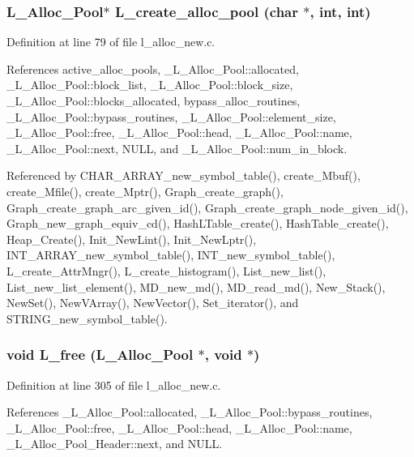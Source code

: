 \subsubsection{\setlength{\rightskip}{0pt plus 5cm}\bf{L\_\-Alloc\_\-Pool}$\ast$ L\_\-create\_\-alloc\_\-pool (char $\ast$, int, int)}\label{l__alloc__new_8h_50486297fa3e0e5231a908843297c86f}




Definition at line 79 of file l\_\-alloc\_\-new.c.

References active\_\-alloc\_\-pools, \_\-L\_\-Alloc\_\-Pool::allocated, \_\-L\_\-Alloc\_\-Pool::block\_\-list, \_\-L\_\-Alloc\_\-Pool::block\_\-size, \_\-L\_\-Alloc\_\-Pool::blocks\_\-allocated, bypass\_\-alloc\_\-routines, \_\-L\_\-Alloc\_\-Pool::bypass\_\-routines, \_\-L\_\-Alloc\_\-Pool::element\_\-size, \_\-L\_\-Alloc\_\-Pool::free, \_\-L\_\-Alloc\_\-Pool::head, \_\-L\_\-Alloc\_\-Pool::name, \_\-L\_\-Alloc\_\-Pool::next, NULL, and \_\-L\_\-Alloc\_\-Pool::num\_\-in\_\-block.

Referenced by CHAR\_\-ARRAY\_\-new\_\-symbol\_\-table(), create\_\-Mbuf(), create\_\-Mfile(), create\_\-Mptr(), Graph\_\-create\_\-graph(), Graph\_\-create\_\-graph\_\-arc\_\-given\_\-id(), Graph\_\-create\_\-graph\_\-node\_\-given\_\-id(), Graph\_\-new\_\-graph\_\-equiv\_\-cd(), Hash\-LTable\_\-create(), Hash\-Table\_\-create(), Heap\_\-Create(), Init\_\-New\-Lint(), Init\_\-New\-Lptr(), INT\_\-ARRAY\_\-new\_\-symbol\_\-table(), INT\_\-new\_\-symbol\_\-table(), L\_\-create\_\-Attr\-Mngr(), L\_\-create\_\-histogram(), List\_\-new\_\-list(), List\_\-new\_\-list\_\-element(), MD\_\-new\_\-md(), MD\_\-read\_\-md(), New\_\-Stack(), New\-Set(), New\-VArray(), New\-Vector(), Set\_\-iterator(), and STRING\_\-new\_\-symbol\_\-table().
\subsubsection{\setlength{\rightskip}{0pt plus 5cm}void L\_\-free (\bf{L\_\-Alloc\_\-Pool} $\ast$, void $\ast$)}\label{l__alloc__new_8h_da797456c2b81499b45e8319426196a9}




Definition at line 305 of file l\_\-alloc\_\-new.c.

References \_\-L\_\-Alloc\_\-Pool::allocated, \_\-L\_\-Alloc\_\-Pool::bypass\_\-routines, \_\-L\_\-Alloc\_\-Pool::free, \_\-L\_\-Alloc\_\-Pool::head, \_\-L\_\-Alloc\_\-Pool::name, \_\-L\_\-Alloc\_\-Pool\_\-Header::next, and NULL.


